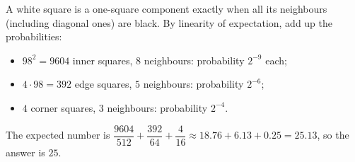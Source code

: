 A white square is a one-square component exactly when all its neighbours (including diagonal ones) are black. By linearity of expectation, add up the probabilities:
\begin{itemize}
\item $98^2=9604$ inner squares, $8$ neighbours: probability $2^{-9}$ each;
\item $4\cdot98=392$ edge squares, $5$ neighbours: probability $2^{-6}$;
\item $4$ corner squares, $3$ neighbours: probability $2^{-4}$.
\end{itemize}
The expected number is $\dfrac{9604}{512}+\dfrac{392}{64}+\dfrac4{16}\approx18.76+6.13+0.25=25.13$, so the answer is $\boxed{25}$.
